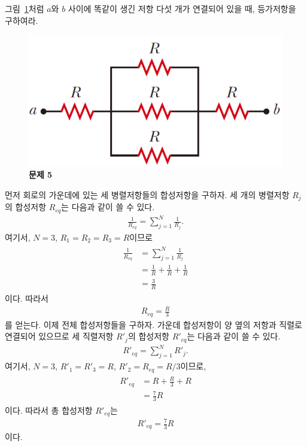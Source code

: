 \documentclass[tightenlines,floatfix,nofootinbib,superscriptaddress,fleqn]{revtex4-2}
\begin{document}
\vspace{1.cm}

그림~\ref{fig:2}처럼 $a$와 $b$ 사이에 똑같이 생긴 저항 다섯 개가
연결되어 있을 때, 등가저항을 구하여라. 
\begin{figure}[htp]
  \centering
  \includegraphics[scale=0.45]{qfig5-20220914-2.pdf}
  \caption{\textbf{문제 5}}
  \label{fig:2}
\end{figure}
\vspace{1.cm}

먼저 회로의 가운데에 있는 세 병렬저항들의 합성저항을 구하자.
세 개의 병렬저항 $R_j$의 합성저항 $R_{eq}$는 다음과 같이 쓸 수 있다.
\begin{align}
  \frac{1}{R_{eq}}=\sum^{N}_{j=1}\frac{1}{R_j}.
\end{align}
여기서, $N=3$, $R_1=R_2=R_3=R$이므로
\begin{align}
  \begin{split}
   \frac{1}{R_{eq}}&=\sum^{N}_{j=1}\frac{1}{R_j}\\
   &=\frac{1}{R}+\frac{1}{R}+\frac{1}{R}\\
   &=\frac{3}{R} 
  \end{split}
\end{align}
이다. 따라서
\begin{align}
  R_{eq}=\frac{R}{3}
\end{align}
를 얻는다. 이제 전체 합성저항들을 구하자. 가운데 합성저항이
양 옆의 저항과 직렬로 연결되어 있으므로 세 직렬저항 $R'_j$의 합성저항
$R'_{eq}$는 다음과 같이 쓸 수 있다.
\begin{align}
  R'_{eq}=\sum^N_{j=1}R'_j.
\end{align}
여기서, $N=3$, $R'_1=R'_3=R$, $R'_2=R_{eq}=R/3$이므로,
\begin{align}
  \begin{split}
    R'_{eq}&=R+\frac{R}{3}+R\\
    &=\frac{7}{3}R
  \end{split}
\end{align}
이다. 따라서 총 합성저항 $R'_{eq}$는
\begin{align}
  R'_{eq}=\frac{7}{3}R
\end{align}
이다.
\end{document}
